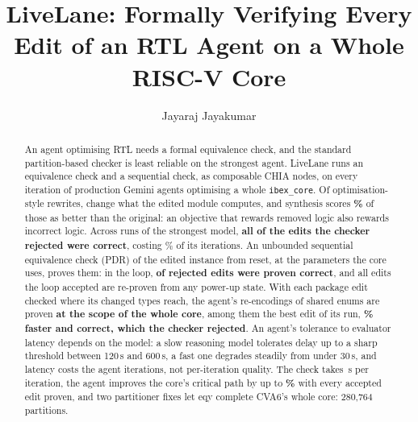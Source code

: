 \documentclass[sigconf,nonacm]{acmart}
\begin{document}
\title{LiveLane: Formally Verifying Every Edit of an RTL Agent
on a Whole RISC-V Core}

\author{Jayaraj Jayakumar}

\begin{abstract}
An agent optimising RTL needs a formal equivalence check, and the standard
partition-based checker is least reliable on the strongest agent. LiveLane runs
an equivalence check and a sequential check, as composable CHIA nodes, on every
iteration of production
Gemini agents optimising a whole \texttt{ibex\_core}. Of \RWtotal{}
optimisation-style rewrites, \RWbmcConfirmed{} change what the edited module computes, and synthesis scores
\textbf{\RWconfEitherPct\%} of those as better than the original: an objective
that rewards removed logic also rewards incorrect logic. Across \ABctlRuns{}
runs of the strongest model, \textbf{all \ABctlFalse{} of the \ABctlRefused{}
edits the checker rejected were correct}, costing \ABctlLostPct\% of its
iterations. An unbounded sequential equivalence check (PDR) of the edited
instance from reset, at the parameters the core uses, proves them: in the loop,
\textbf{\ABscTold{} of \ABscRefused{} rejected edits were proven
correct}\ABscRest{}, and all \ABacc{} edits the loop accepted are re-proven
from any power-up state. With each package edit checked where its changed
types reach, the agent's re-encodings of shared enums are proven
\textbf{at the scope of the whole core}, among them the best edit of its
run, \textbf{\PKGbestPct\% faster and correct, which the checker rejected}. An
agent's tolerance to evaluator latency depends on the model: a slow reasoning
model tolerates delay up to a sharp threshold between 120\,s and 600\,s, a fast
one degrades steadily from under 30\,s, and latency costs the agent iterations,
not per-iteration quality. The check takes \AGgateWarm\,s per iteration, the
agent improves the core's critical path by up to \textbf{\AGbestPct\%} with
every accepted edit proven, and two partitioner fixes let eqy complete CVA6's
whole core: 280{,}764 partitions.
\end{abstract}


\maketitle
\end{document}
